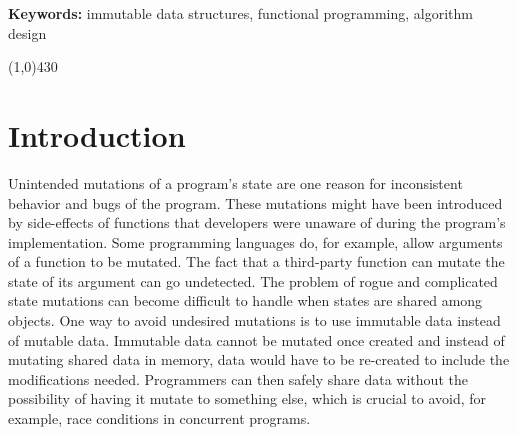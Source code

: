 \documentclass[12pt,twoside]{article}
\begin{document}
\vspace{5mm}

\noindent \textbf{Keywords:} immutable data structures, functional programming, algorithm design

\vspace{4mm}
\begin{center}
	\line(1,0){430}
\end{center}



\newpage
\tableofcontents
\newpage

\setcounter{page}{1}

\section{Introduction}
Unintended mutations of a program’s state are one reason for inconsistent behavior and bugs of the
program. These mutations might have been introduced by side-effects of functions that developers
were unaware of during the program’s implementation. Some programming languages do, for example,
allow arguments of a function to be mutated. The fact that a third-party function can mutate the
state of its argument can go undetected. The problem of rogue and complicated state mutations can
become difficult to handle when states are shared among objects. One way to avoid undesired mutations
is to use immutable data instead of mutable data. Immutable data cannot be mutated once created
and instead of mutating shared data in memory, data would have to be re-created to include the modifications
needed. Programmers can then safely share data without the possibility of having it mutate to
something else, which is crucial to avoid, for example, race conditions in concurrent programs.
\end{document}
